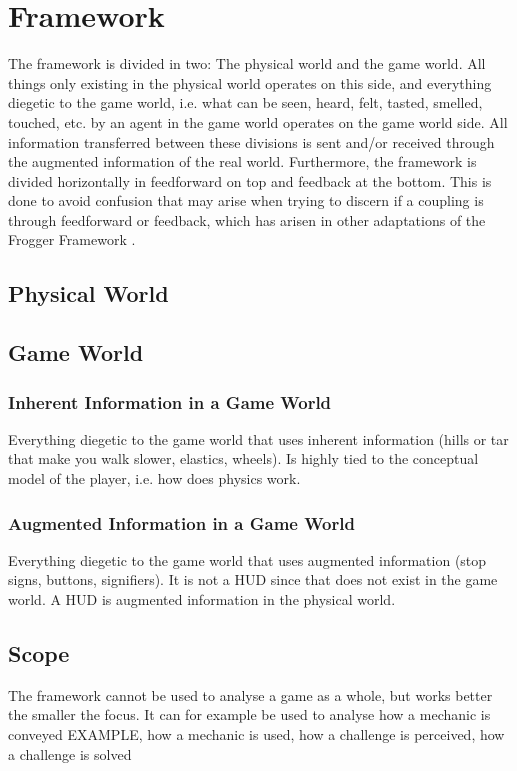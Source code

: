 \section{Framework}

The framework is divided in two: The physical world and the game world. All things only existing in the physical world operates on this side, and everything diegetic to the game world, i.e. what can be seen, heard, felt, tasted, smelled, touched, etc. by an agent in the game world operates on the game world side. All information transferred between these divisions is sent and/or received through the augmented information of the real world.
Furthermore, the framework is divided horizontally in feedforward on top and feedback at the bottom. This is done to avoid confusion that may arise when trying to discern if a coupling is through feedforward or feedback, which has arisen in other adaptations of the Frogger Framework \cite{tangifrog}.

\subsection{Physical World}
\cite{norman} \cite{frogger}

\subsection{Game World}

\subsubsection{Inherent Information in a Game World}
Everything diegetic to the game world that uses inherent information (hills or tar that make you walk slower, elastics, wheels). Is highly tied to the conceptual model of the player, i.e. how does physics work.

\subsubsection{Augmented Information in a Game World}
Everything diegetic to the game world that uses augmented information (stop signs, buttons, signifiers). It is not a HUD since that does not exist in the game world. A HUD is augmented information in the physical world.

\subsection{Scope}
The framework cannot be used to analyse a game as a whole, but works better the smaller the focus. It can for example be used to analyse how a mechanic is conveyed EXAMPLE, how a mechanic is used, how a challenge is perceived, how a challenge is solved

